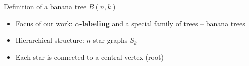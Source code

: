 \documentclass{beamer}
\begin{document}
\begin{frame}{Definition of a banana tree \( B(n, k) \)}
  \begin{itemize}
    \item Focus of our work: \textbf{$\alpha$-labeling} and a special family of trees -- banana trees
    \item Hierarchical structure: \( n \) star graphs \( S_k \)
    \item Each star is connected to a central vertex (root)
  \end{itemize}

\end{frame}
\end{document}
